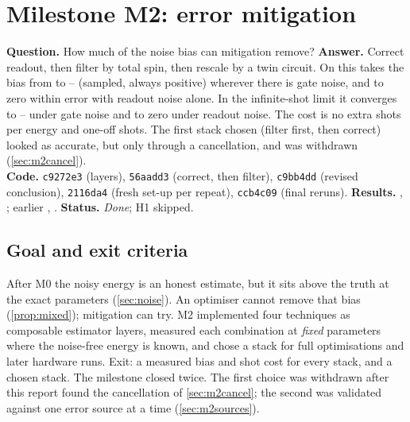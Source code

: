 \section{Milestone M2: error mitigation}
\label{sec:m2}

\begin{tcolorbox}[colback=gray!5, colframe=gray!40, title={M2 at a glance}, fonttitle=\bfseries]
  \textbf{Question.} How much of the noise bias can mitigation remove?\quad
  \textbf{Answer.} Correct readout, then filter by total spin, then rescale by a twin circuit.
  On  this takes the bias from \VMbHvaFullZeroRawRel{} to
  \VMbRoSymTwinMin{}--\VMbRoSymTwinMax{} (sampled, always positive) wherever there is gate noise,
  and to zero within error with readout noise alone. In the infinite-shot limit it converges to
  \VMxTwMin{}--\VMxTwMax{} under gate noise and to zero under readout noise. The cost is no
  extra shots per energy and \VMbSetupRoSymTwin{} one-off shots. The first stack chosen
  (filter first, then correct) looked as accurate, but only through a cancellation, and was
  withdrawn (\cref{sec:m2cancel}).\\
  \textbf{Code.} \texttt{c9272e3} (layers), \texttt{56aadd3} (correct, then filter),
  \texttt{c9bb4dd} (revised conclusion), \texttt{2116da4} (fresh set-up per repeat),
  \texttt{ccb4c09} (final reruns). \textbf{Results.} ,
  ; earlier , .
  \textbf{Status.} \emph{Done}; H1 skipped.
\end{tcolorbox}

\subsection{Goal and exit criteria}

After M0 the noisy energy is an honest estimate, but it sits \VMtHvaZeroRawRel{} above the truth at
the exact parameters (\cref{sec:noise}). An optimiser cannot remove that bias
(\cref{prop:mixed}); mitigation can try. M2 implemented four techniques as composable estimator
layers, measured each combination at \emph{fixed} parameters where the noise-free energy is
known, and chose a stack for full optimisations and later hardware runs. Exit: a measured bias
and shot cost for every stack, and a chosen stack. The milestone closed twice. The first choice
was withdrawn after this report found the cancellation of \cref{sec:m2cancel}; the second was
validated against one error source at a time (\cref{sec:m2sources}).

